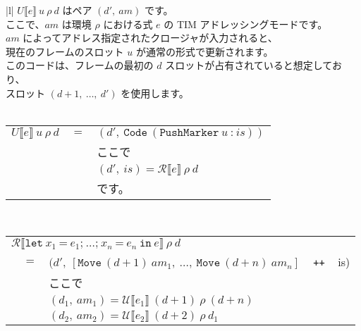 \documentclass{jarticle}
\begin{document}
\begin{tabular} {|l|} \hline
	$U \llbracket e \rrbracket ~ u ~ \rho ~ d$ はペア $(d', ~ am)$ です。       \\
	ここで、$am$ は環境 $\rho$ における式 $e$ の TIM アドレッシングモードです。 \\
	$am$ によってアドレス指定されたクロージャが入力されると、                   \\
	現在のフレームのスロット $u$ が通常の形式で更新されます。                   \\
	このコードは、フレームの最初の $d$ スロットが占有されていると想定しており、 \\
	スロット $(d + 1, ~ \ldots, ~ d')$ を使用します。                           \\
	\\
	\begin{tabular}{r c l}
		$U \llbracket e \rrbracket ~ u ~ \rho ~ d$ & $=$ & $(d', ~ \texttt{Code} ~ (\texttt{PushMarker} ~ u ~ \texttt{:} ~ is))$ \\
		                                           &     & ここで                                                                \\
		                                           &     & $(d', ~ is) = \mathcal{R} \llbracket e \rrbracket ~ \rho ~ d$         \\
		                                           &     & です。
	\end{tabular}
	\\ \hline
	\begin{tabular}{r c l}
		\multicolumn{3}{l}{$\mathcal{R} \llbracket \texttt{let} ~ x_1 ~ \texttt{=} ~ e_1\texttt{;} ~  \ldots \texttt{;} ~ x_n ~ \texttt{=} ~ e_n ~ \texttt{in} ~ e \rrbracket ~ \rho ~ d$} \\
		 & $=$ & $(d', ~ \left[ \texttt{Move} ~ (d + 1) ~ am_1, ~ \ldots, ~ \texttt{Move} ~ (d + n) ~ am_n \right]$ ~ \texttt{++} ~ is)                                                    \\
		 &     & ここで                                                                                                                                                                    \\
		 &     & $(d_1, ~ am_1) = \mathcal{U} \llbracket e_1 \rrbracket ~ (d + 1) ~ \rho ~ (d + n)$                                                                                        \\
		 &     & $(d_2, ~ am_2) = \mathcal{U} \llbracket e_2 \rrbracket ~ (d + 2) ~ \rho ~ d_1$                                                                                            \\

\end{tabular}
\end{tabular}
\end{document}
